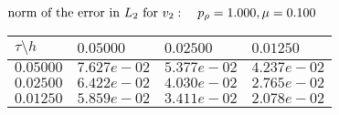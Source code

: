$
 \text{norm of the error in $L_2$ for $v_2$}: \quad p_{\rho}=1.000, \mu = 0.100 \\ $
\begin{tabular}{|p{0.6in}|p{1.2in}|p{1.2in}|p{1.2in}|} \hline
$\tau\setminus h$ & $0.05000$ & $0.02500$& $0.01250$ \\ \hline
$0.05000$ & $7.627e-02$ &$5.377e-02$ &$4.237e-02$  \\ \hline
$0.02500$ & $6.422e-02$ &$4.030e-02$ &$2.765e-02$  \\ \hline
$0.01250$ & $5.859e-02$ &$3.411e-02$ &$2.078e-02$  \\ \hline
\end{tabular}\\[20pt]
